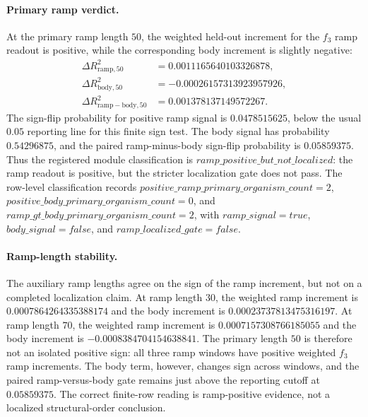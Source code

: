 \paragraph{Primary ramp verdict.}
At the primary ramp length $50$, the weighted held-out increment for the $f_3$ ramp readout is positive, while the corresponding body increment is slightly negative:
$$
\begin{aligned}
\Delta R^2_{\mathrm{ramp},50} &= 0.0011165640103326878,\\
\Delta R^2_{\mathrm{body},50} &= -0.00026157313923957926,\\
\Delta R^2_{\mathrm{ramp-body},50} &= 0.001378137149572267.
\end{aligned}
$$
The sign-flip probability for positive ramp signal is $0.0478515625$, below the usual $0.05$ reporting line for this finite sign test. The body signal has probability $0.54296875$, and the paired ramp-minus-body sign-flip probability is $0.05859375$. Thus the registered module classification is $ramp\_positive\_but\_not\_localized$: the ramp readout is positive, but the stricter localization gate does not pass. The row-level classification records $positive\_ramp\_primary\_organism\_count = 2$, $positive\_body\_primary\_organism\_count = 0$, and $ramp\_gt\_body\_primary\_organism\_count = 2$, with $ramp\_signal = true$, $body\_signal = false$, and $ramp\_localized\_gate = false$.

\paragraph{Ramp-length stability.}
The auxiliary ramp lengths agree on the sign of the ramp increment, but not on a completed localization claim. At ramp length $30$, the weighted ramp increment is $0.0007864264335388174$ and the body increment is $0.00023737813475316197$. At ramp length $70$, the weighted ramp increment is $0.0007157308766185055$ and the body increment is $-0.0008384704154638841$. The primary length $50$ is therefore not an isolated positive sign: all three ramp windows have positive weighted $f_3$ ramp increments. The body term, however, changes sign across windows, and the paired ramp-versus-body gate remains just above the reporting cutoff at $0.05859375$. The correct finite-row reading is ramp-positive evidence, not a localized structural-order conclusion.

